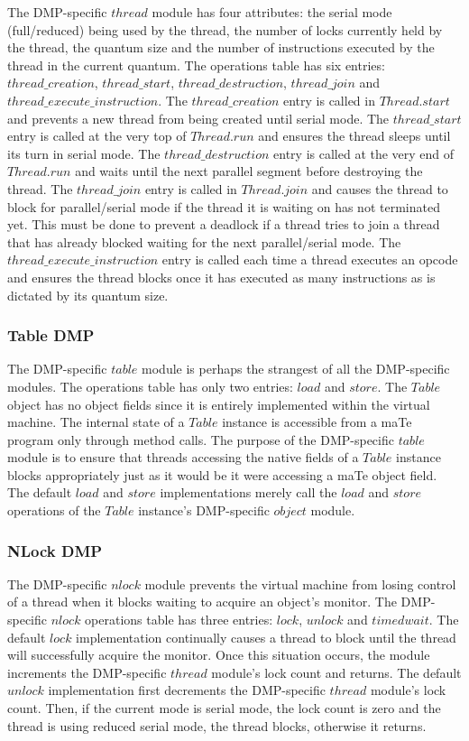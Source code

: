 The DMP-specific $thread$ module has four attributes: the serial mode
(full/reduced) being used by the thread, the number of locks currently
held by the thread, the quantum size and the number of instructions
executed by the thread in the current quantum.  The operations table
has six entries: $thread\_creation$, $thread\_start$,
$thread\_destruction$, $thread\_join$ and
$thread\_execute\_instruction$.  The $thread\_creation$ entry is
called in $Thread.start$ and prevents a new thread from being created
until serial mode.  The $thread\_start$ entry is called at the very
top of $Thread.run$ and ensures the thread sleeps until its turn in
serial mode.  The $thread\_destruction$ entry is called at the very
end of $Thread.run$ and waits until the next parallel segment before
destroying the thread.  The $thread\_join$ entry is called in
$Thread.join$ and causes the thread to block for parallel/serial mode
if the thread it is waiting on has not terminated yet.  This must be
done to prevent a deadlock if a thread tries to join a thread that has
already blocked waiting for the next parallel/serial mode.  The
$thread\_execute\_instruction$ entry is called each time a thread
executes an opcode and ensures the thread blocks once it has executed
as many instructions as is dictated by its quantum size.

\subsubsection{Table DMP}

The DMP-specific $table$ module is perhaps the strangest of all the
DMP-specific modules.  The operations table has only two entries:
$load$ and $store$.  The $Table$ object has no object fields since it
is entirely implemented within the virtual machine.  The internal
state of a $Table$ instance is accessible from a maTe program only
through method calls.  The purpose of the DMP-specific $table$ module
is to ensure that threads accessing the native fields of a $Table$
instance blocks appropriately just as it would be it were accessing a
maTe object field.  The default $load$ and $store$ implementations
merely call the $load$ and $store$ operations of the $Table$
instance's DMP-specific $object$ module.

\subsubsection{NLock DMP}

The DMP-specific $nlock$ module prevents the virtual machine from
losing control of a thread when it blocks waiting to acquire an
object's monitor.  The DMP-specific $nlock$ operations table has three
entries: $lock$, $unlock$ and $timedwait$.  The default $lock$
implementation continually causes a thread to block until the thread
will successfully acquire the monitor.  Once this situation occurs,
the module increments the DMP-specific $thread$ module's lock count
and returns.  The default $unlock$ implementation first decrements the
DMP-specific $thread$ module's lock count. Then, if the current mode
is serial mode, the lock count is zero and the thread is using reduced
serial mode, the thread blocks, otherwise it returns.

